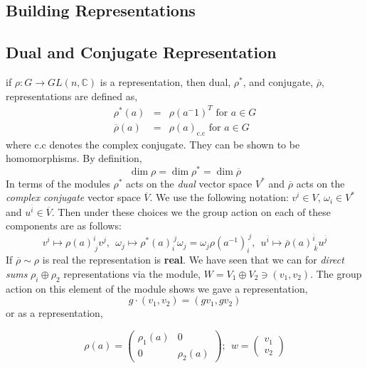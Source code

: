 \begin{enumerate}
\section{Building Representations}
\subsection{Dual and Conjugate Representation}
if $\rho: G \rightarrow GL(n, \mathbb{C})$ is a representation, then dual, $\rho^*$, and conjugate, $\overline{\rho}$, representations are defined as, 
\begin{eqnarray}
    \rho^*(a) &=& \rho(a^-1)^T \text{ for } a\in G\\
    \overline{\rho}(a) &=& \rho(a)_{\text{c.c}} \text{  for } a\in G
\end{eqnarray}
where c.c denotes the complex conjugate. They can be shown to be homomorphisms. By definition, 
\begin{equation}
    \dim\rho = \dim\rho^* = \dim\overline{\rho}
\end{equation}
In terms of the modules $\rho^*$ acts on the \textit{dual} vector space $V^*$ and $\overline{\rho}$ acts on the \textit{complex conjugate} vector space $\overline{V}$. We use the following notation: $v^i\in V$, $\omega_i\in V^*$ and $u^{\overline{i}}\in \overline{V}$. Then under these choices we the group action on each of these components are as follows: 
\begin{equation}
    v^i\mapsto \rho(a)^i_{\ j} v^j, \ \  \omega_j\mapsto \rho^*(a)^{\ j}_{i} \omega_j = \omega_{j}\rho(a^{-1})^{\ j}_{i}, \ \ u^{\overline{i}}\mapsto \overline{\rho}(a)^{\overline{i}}_{\ \overline{k}}u^{\overline{j}}
\end{equation}
If $\overline{\rho}\sim{} \rho$ is real the representation is \textbf{real}. We have seen that we can for \textit{direct sums} $\rho_{i}\oplus\rho_2$ representations via the module, $W = V_1\oplus V_2\ni (v_1, v_2)$. The group action on this element of the module shows we gave a representation, 
\begin{equation}
    g\cdot(v_1, v_2) = (gv_1, gv_2)
\end{equation}
or as a representation, 

\begin{equation}
    \rho(a) = \begin{pmatrix}
        \rho_1(a) & 0 \\
        0 & \rho_2(a)
    \end{pmatrix}; \ \ w = \begin{pmatrix}
     v_1 \\ v_2   
    \end{pmatrix}
\end{equation}

\end{enumerate}
